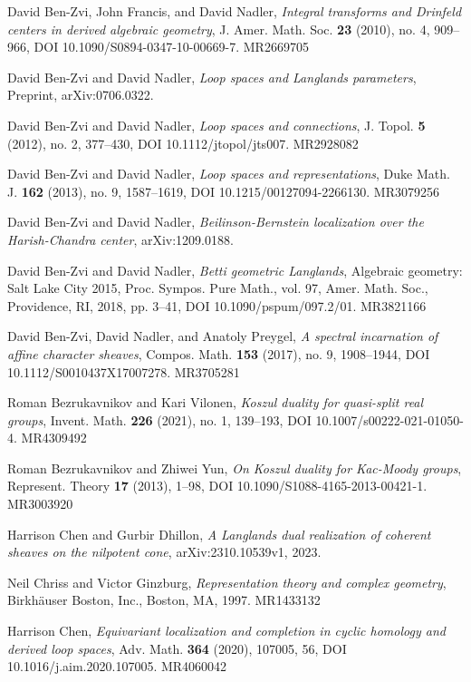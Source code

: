 \begin{refs}
\item[{[BFN10]}] David Ben-Zvi, John Francis, and David Nadler, \emph{Integral transforms and Drinfeld centers in derived algebraic geometry}, J. Amer. Math. Soc. \textbf{23} (2010), no. 4, 909--966, DOI 10.1090/S0894-0347-10-00669-7. MR2669705
\item[{[BN07]}] David Ben-Zvi and David Nadler, \emph{Loop spaces and Langlands parameters}, Preprint, arXiv:0706.0322.
\item[{[BN10a]}] David Ben-Zvi and David Nadler, \emph{Loop spaces and connections}, J. Topol. \textbf{5} (2012), no. 2, 377--430, DOI 10.1112/jtopol/jts007. MR2928082
\item[{[BN10b]}] David Ben-Zvi and David Nadler, \emph{Loop spaces and representations}, Duke Math. J. \textbf{162} (2013), no. 9, 1587--1619, DOI 10.1215/00127094-2266130. MR3079256
\item[{[BN12]}] David Ben-Zvi and David Nadler, \emph{Beilinson-Bernstein localization over the Harish-Chandra center}, arXiv:1209.0188.
\item[{[BN16]}] David Ben-Zvi and David Nadler, \emph{Betti geometric Langlands}, Algebraic geometry: Salt Lake City 2015, Proc. Sympos. Pure Math., vol. 97, Amer. Math. Soc., Providence, RI, 2018, pp. 3--41, DOI 10.1090/pspum/097.2/01. MR3821166
\item[{[BNP17]}] David Ben-Zvi, David Nadler, and Anatoly Preygel, \emph{A spectral incarnation of affine character sheaves}, Compos. Math. \textbf{153} (2017), no. 9, 1908--1944, DOI 10.1112/S0010437X17007278. MR3705281
\item[{[BV21]}] Roman Bezrukavnikov and Kari Vilonen, \emph{Koszul duality for quasi-split real groups}, Invent. Math. \textbf{226} (2021), no. 1, 139--193, DOI 10.1007/s00222-021-01050-4. MR4309492
\item[{[BY13]}] Roman Bezrukavnikov and Zhiwei Yun, \emph{On Koszul duality for Kac-Moody groups}, Represent. Theory \textbf{17} (2013), 1--98, DOI 10.1090/S1088-4165-2013-00421-1. MR3003920
\item[{[CD22]}] Harrison Chen and Gurbir Dhillon, \emph{A Langlands dual realization of coherent sheaves on the nilpotent cone}, arXiv:2310.10539v1, 2023.
\item[{[CG97]}] Neil Chriss and Victor Ginzburg, \emph{Representation theory and complex geometry}, Birkh\"auser Boston, Inc., Boston, MA, 1997. MR1433132
\item[{[Ch20]}] Harrison Chen, \emph{Equivariant localization and completion in cyclic homology and derived loop spaces}, Adv. Math. \textbf{364} (2020), 107005, 56, DOI 10.1016/j.aim.2020.107005. MR4060042

\end{refs}
